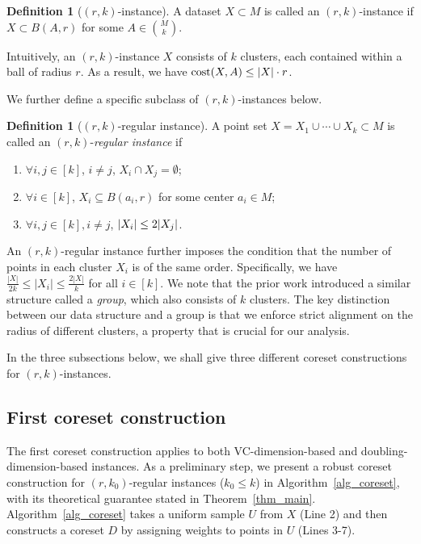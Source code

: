 \documentclass[11pt,letterpaper]{article}
\theoremstyle{definition}
\newtheorem{definition}[theorem]{Definition}
\DeclarePairedDelimiter{\abs}{\lvert}{\rvert}
\begin{document}
\begin{definition}[$(r,k)$-instance] \label{def:rk}
A dataset $X\subset M$ is called an $(r,k)$-instance if
$X\subset B(A,r)$ for some $A\in \binom{M}{k}$.
\end{definition}

Intuitively, an \( (r,k) \)-instance \( X \) consists of \( k \) clusters, each contained within a ball of radius \( r \).  
%
As a result, we have \( \cost(X,A) \leq |X| \cdot r \).  
%

We further define a specific subclass of \( (r,k) \)-instances below.

\begin{definition}[$(r,k)$-regular instance] A point set $X=X_1\cup\cdots\cup X_{k}\subset M$ is called an $(r,k)$-\emph{regular instance} if %
	\begin{enumerate}[label=(\roman*),itemsep=0pt]
		\item $\forall i,j\in [k]$, $i\neq j$, $X_i\cap X_j=\emptyset$;
		\item $\forall i\in [k]$, $X_i\subseteq B(a_i,r)$ for some center $a_i\in M$;
		\item $\forall i,j\in [k], i\neq j$, $\abs{X_i} \leq 2\abs{X_j}$.
	\end{enumerate} 
\end{definition}


An \( (r,k) \)-regular instance further imposes the condition that the number of points in each cluster \( X_i \) is of the same order.  
%
Specifically, we have \( \frac{|X|}{2k} \leq |X_i| \leq \frac{2|X|}{k} \) for all \( i \in [k] \).  
%
We note that the prior work \cite{cohen2021new,Cohen25} introduced a similar structure called a \emph{group}, which also consists of \( k \) clusters.
%
The key distinction between our data structure and a group is that we enforce strict alignment on the radius of different clusters, a property that is crucial for our analysis.

In the three subsections below, we shall give three different coreset constructions for $(r,k)$-instances. 

\subsection{First coreset construction}
\label{sec_mainring}

The first coreset construction applies to both VC-dimension-based and doubling-dimension-based instances.  
%
As a preliminary step, we present a robust coreset construction for \( (r,k_0) \)-regular instances (\( k_0 \leq k \)) in Algorithm~\ref{alg_coreset}, with its theoretical guarantee stated in Theorem~\ref{thm_main}.
%
Algorithm~\ref{alg_coreset} takes a uniform sample $U$ from $X$ (Line 2) and then constructs a coreset $D$ by assigning weights to points in $U$ (Lines 3-7).
\end{document}
